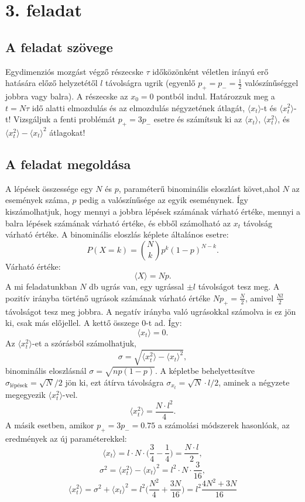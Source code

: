 \documentclass[12pt]{article}
\begin{document}
\section*{3. feladat}
\subsection*{A feladat szövege}
Egydimenziós mozgást végző részecske $\tau$ időközönként véletlen irányú erő hatására előző helyzetétől $l$ távolságra ugrik (egyenlő $p_{+} = p_{-} =\frac{1}{2} $ valószínűséggel jobbra vagy balra). A részecske az $x_0 = 0$ pontból indul.
Határozzuk meg a $ t = N \tau$ idő alatti elmozdulás és az elmozdulás négyzetének átlagát, $\langle x_t\rangle$-t és $\langle x^2_t \rangle$-t!
Vizsgáljuk a fenti problémát $p_+ = 3p_-$ esetre és számítsuk ki az $\langle x_t \rangle $, $\langle x^2_t\rangle$, és $\langle x^2_t\rangle-\langle x_t \rangle ^2$ átlagokat!
\subsection*{A feladat megoldása}
A lépések összessége egy $N$ és $p$, paraméterű binominális eloszlást követ,ahol $N$ az események száma, $p$ pedig a valószínűsége az egyik eseménynek. Így kiszámolhatjuk, hogy mennyi a jobbra lépések számának várható értéke, mennyi a balra lépések számának várható értéke, és ebből számolható az $x_t$ távolság várható értéke. A binominális eloszlás képlete általános esetre:
$$P(X = k) = {{N}\choose{k}}p^k(1-p)^{N-k}.$$
Várható értéke:
$$ \langle X \rangle = Np .$$
A mi feladatunkban $N$ db ugrás van, egy ugrással $\pm l$ távolságot tesz meg. A pozitív irányba történő ugrások számának várható értéke $Np_+ = \frac{N}{2}$, amivel $\frac{Nl}{2}$ távolságot tesz meg jobbra. A negatív irányba való ugrásokkal számolva is ez jön ki, csak más előjellel. A kettő összege $0$-t ad. Így:
$$\langle x_t \rangle = 0. $$
Az $\langle x^2_t \rangle $-et a szórásból számolhatjuk,
$$ \sigma = \sqrt{\langle x^2_t \rangle-\langle x_t \rangle ^2},$$ binominális eloszlásnál $\sigma = \sqrt{np(1-p)}$. A képletbe behelyettesítve $\sigma_{\text{lépések}} = \sqrt{N}/2$ jön ki, ezt átírva távolságra $\sigma_{x_t} = \sqrt{N}\cdot l /2$, aminek a négyzete megegyezik $\langle x^2_t \rangle $-vel.
$$\langle x^2_t \rangle = \frac{N\cdot l^2}{4}.$$
A másik esetben, amikor $p_+=3p_-=0.75$ a számolási módszerek hasonlóak, az eredmények az új paraméterekkel:
$$\langle x_t \rangle = l\cdot N\cdot \Big(\frac{3}{4}-\frac{1}{4}\Big ) = \frac{N\cdot l}{2},$$
$$\sigma^2 = {\langle x^2_t \rangle-\langle x_t \rangle ^2} = l^2\cdot N\cdot \frac{3}{16},$$
$$\langle x^2_t \rangle = \sigma^2 + \langle x_t \rangle ^2  = l^2\Big ( \frac{N^2}{4} + \frac{3N}{16} \Big ) = l^2\frac{4N^2 + 3N}{16}$$
\end{document}
